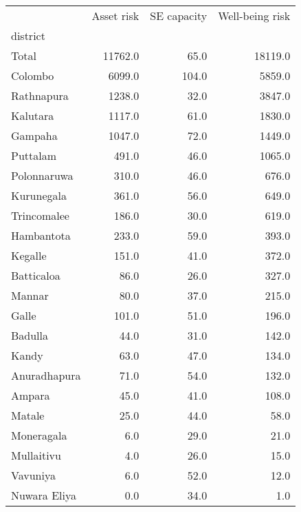 \begin{tabular}{lrrr}
\toprule
{} &  Asset risk &  SE capacity &  Well-being risk \\
district     &             &              &                  \\
\midrule
Total        &     11762.0 &         65.0 &          18119.0 \\
Colombo      &      6099.0 &        104.0 &           5859.0 \\
Rathnapura   &      1238.0 &         32.0 &           3847.0 \\
Kalutara     &      1117.0 &         61.0 &           1830.0 \\
Gampaha      &      1047.0 &         72.0 &           1449.0 \\
Puttalam     &       491.0 &         46.0 &           1065.0 \\
Polonnaruwa  &       310.0 &         46.0 &            676.0 \\
Kurunegala   &       361.0 &         56.0 &            649.0 \\
Trincomalee  &       186.0 &         30.0 &            619.0 \\
Hambantota   &       233.0 &         59.0 &            393.0 \\
Kegalle      &       151.0 &         41.0 &            372.0 \\
Batticaloa   &        86.0 &         26.0 &            327.0 \\
Mannar       &        80.0 &         37.0 &            215.0 \\
Galle        &       101.0 &         51.0 &            196.0 \\
Badulla      &        44.0 &         31.0 &            142.0 \\
Kandy        &        63.0 &         47.0 &            134.0 \\
Anuradhapura &        71.0 &         54.0 &            132.0 \\
Ampara       &        45.0 &         41.0 &            108.0 \\
Matale       &        25.0 &         44.0 &             58.0 \\
Moneragala   &         6.0 &         29.0 &             21.0 \\
Mullaitivu   &         4.0 &         26.0 &             15.0 \\
Vavuniya     &         6.0 &         52.0 &             12.0 \\
Nuwara Eliya &         0.0 &         34.0 &              1.0 \\
\bottomrule
\end{tabular}
